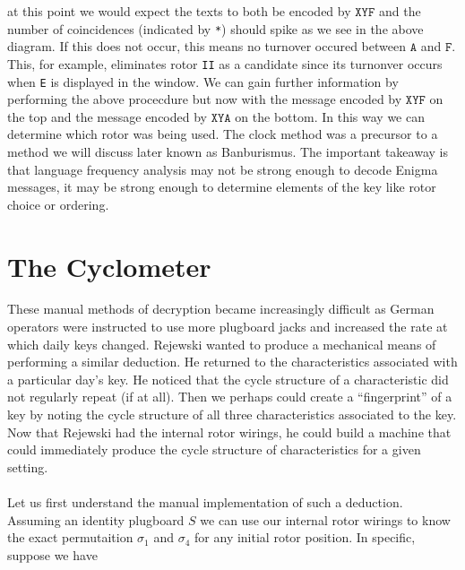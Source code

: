 at this point we would expect the texts to both be encoded by $\texttt{XYF}$ and the number of coincidences (indicated by \texttt{*}) should spike as we see in the above diagram. If this does not occur, this means no turnover occured between $\texttt{A}$ and $\texttt{F}$. This, for example, eliminates rotor \texttt{II} as a candidate since its turnonver occurs when \texttt{E} is displayed in the window. We can gain further information by performing the above procecdure but now with the message encoded by $\texttt{XYF}$ on the top and the message encoded by $\texttt{XYA}$ on the bottom. In this way we can determine which rotor was being used. The clock method was a precursor to a method we will discuss later known as Banburismus. The important takeaway is that language frequency analysis may not be strong enough to decode Enigma messages, it may be strong enough to determine elements of the key like rotor choice or ordering.

\section{The Cyclometer}

These manual methods of decryption became increasingly difficult as German operators were instructed to use more plugboard jacks and increased the rate at which daily keys changed. Rejewski wanted to produce a mechanical means of performing a similar deduction. He returned to the characteristics associated with a particular day's key. He noticed that the cycle structure of a characteristic did not regularly repeat (if at all). Then we perhaps could create a ``fingerprint'' of a key by noting the cycle structure of all three characteristics associated to the key. Now that Rejewski had the internal rotor wirings, he could build a machine that could immediately produce the cycle structure of characteristics for a given setting.
\\\\Let us first understand the manual implementation of such a deduction. Assuming an identity plugboard $S$ we can use our internal rotor wirings to know the exact permutaition $\sigma_1$ and $\sigma_4$ for any initial rotor position. In specific, suppose we have

